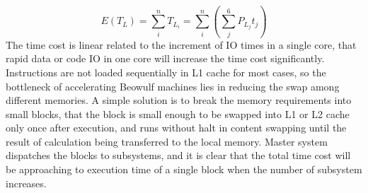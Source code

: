 \documentclass[11pt,openright,a4paper]{report}
\begin{document}
\begin{equation}
\label{equa:1}
E(T_{L})=\sum_{i}^{n}T_{L_{i}}=\sum_{i}^{n}(\sum_{j}^{6}P_{L_{j}}t_{j})
\end{equation}
The time cost is linear related to the increment of IO times in a single core, that rapid data or code IO in one core will increase the time cost significantly.
Instructions are not loaded sequentially in L1 cache for most cases, so the bottleneck of accelerating Beowulf machines lies in reducing the swap among different memories. A simple solution is to break the memory requirements into small blocks, that the block is small enough to be swapped into L1 or L2 cache only once after execution, and runs without halt in content swapping until the result of calculation being transferred to the local memory. Master system dispatches the blocks to subsystems, and it is clear that the total time cost will be approaching to execution time of a single block when the number of subsystem increases.\\
\end{document}
